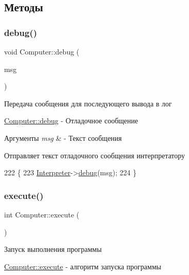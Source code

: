 \subsection{Методы}
\hypertarget{class_computer_a10ca6c6b200630119201de16d7368e0f}{}\label{class_computer_a10ca6c6b200630119201de16d7368e0f} 
\subsubsection{\texorpdfstring{debug()}{debug()}}
{\footnotesize\ttfamily void Computer\+::debug (\begin{DoxyParamCaption}\item[{Q\+String}]{msg }\end{DoxyParamCaption})\hspace{0.3cm}{\ttfamily [private]}}



Передача сообщения для последующего вывода в лог 

\hyperlink{class_computer_a10ca6c6b200630119201de16d7368e0f}{Computer\+::debug} -\/ Отладочное сообщение


\begin{DoxyParams}{Аргументы}
{\em msg} & -\/ Текст сообщения\\
\hline
\end{DoxyParams}
Отправляет текст отладочного сообщения интерпретатору 
\begin{DoxyCode}
222 \{
223     \hyperlink{class_computer_aa58d6e565412d6705657c0418b1e59fe}{Interpreter}->\hyperlink{classinterpreter_a5153712027e3e4344f72336f8b5cfa6d}{debug}(msg);
224 \}
\end{DoxyCode}
\hypertarget{class_computer_a4303af6a549fc8f792de0d2d18a9e05f}{}\label{class_computer_a4303af6a549fc8f792de0d2d18a9e05f} 
\subsubsection{\texorpdfstring{execute()}{execute()}}
{\footnotesize\ttfamily int Computer\+::execute (\begin{DoxyParamCaption}{ }\end{DoxyParamCaption})}



Запуск выполнения программы 

\hyperlink{class_computer_a4303af6a549fc8f792de0d2d18a9e05f}{Computer\+::execute} -\/ алгоритм запуска программы

